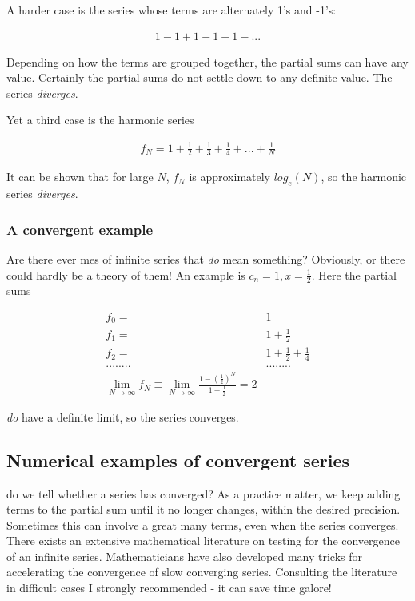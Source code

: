 A harder case is the series whose terms are alternately 1's and -1's:

\begin{align}
    1 - 1 + 1 - 1 + 1 - ...
\end{align}

Depending on how the terms are grouped together, the partial
sums can have any value. Certainly the partial sums do not settle
down to any definite value. The series \textit{diverges}.

Yet a third case is the harmonic series

\begin{align}
    f_{N} = 1 + \frac{1}{2} + \frac{1}{3} + \frac{1}{4} + ... + \frac{1}{N}
\end{align}

It can be shown that for large $N$, $f_{N}$ is approximately $log_{e}(N)$, so the harmonic series \textit{diverges}.

\subsubsection{A convergent example}
Are there ever mes of infinite series that \textit{do} mean something? Obviously, or there could hardly be a theory of them! An example is $c_{n}=1, x = \frac{1}{2}$. Here the partial sums

\begin{align}
f_{0} =& 1                               \\
f_{1} =& 1 + \frac{1}{2}                 \\
f_{2} =& 1 + \frac{1}{2} + \frac{1}{4}   \\
........&........                        \\
\lim_{N\to\infty} f_{N} \equiv \lim_{N\to\infty} \frac{1-(\frac{1}{2})^{N}}{1-\frac{1}{2}} = 2
\end{align}

\textit{do} have a definite limit, so the series converges.

\subsection{Numerical examples of convergent series}
 do we tell whether a series has converged? As a practice matter, we keep adding terms to the partial sum until it no longer changes, within the desired precision. Sometimes this can involve a great many terms, even when the series converges. There exists an extensive mathematical literature on testing for the convergence of an infinite series. Mathematicians have also developed many tricks for accelerating the convergence of slow converging series. Consulting the literature in difficult cases I strongly recommended - it can save time galore!

